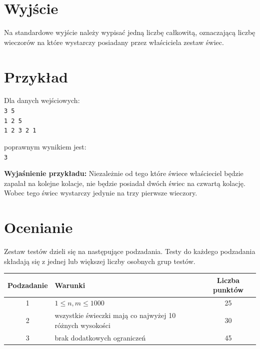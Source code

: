 \documentclass[10pt]{article}
\begin{document}

    \section*{Wyjście}
    
    Na standardowe wyjście należy wypisać jedną liczbę całkowitą, oznaczającą liczbę wieczorów na które wystarczy posiadany przez właściciela zestaw świec.


    \section*{Przykład}
    
    \noindent
    \begin{minipage}[t]{0.5\textwidth}
        Dla danych wejściowych:\vspace{1ex}\\
        \texttt{3 5\\1 2 5\\1 2 3 2 1}
    \end{minipage}
    \begin{minipage}[t]{0.5\textwidth}
        poprawnym wynikiem jest:\vspace{1ex}\\
        \texttt{3}
    \end{minipage}
    
    \vspace{2ex}
    \noindent\textbf{Wyjaśnienie przykładu:} Niezależnie od tego które świece właścieciel będzie zapalał na kolejne kolacje, nie będzie posiadał dwóch świec na czwartą kolację. Wobec tego świec wystarczy jedynie na trzy pierwsze wieczory.
    
    

    \section*{Ocenianie}
        
    Zestaw testów dzieli się na następujące podzadania. Testy do każdego podzadania składają się z jednej lub większej liczby osobnych grup testów.
    
    \begin{center}
        \begin{tabular}{ |c|p{9cm}|c| }
            \hline
            \textbf{Podzadanie} & \textbf{Warunki} & \textbf{Liczba punktów}\\
            \hline
            1 & $1 \leq n, m \leq 1000$ & 25\\
            \hline
            2 & wszystkie świeczki mają co najwyżej 10 różnych wysokości & 30\\
            \hline
            3 & brak dodatkowych ograniczeń & 45\\
            \hline
        \end{tabular}
    \end{center}
\end{document}
